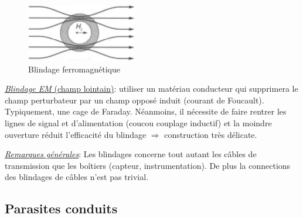 \begin{figure}[H] 
	\centering 
	\includegraphics[height=4\baselineskip]{ch3/image8} 
	\caption{Blindage ferromagnétique}
	\label{fig:blindmagn}
\end{figure}

\underline{\textit{Blindage EM} (champ lointain)}: utiliser un matériau conducteur qui supprimera le champ perturbateur par un champ opposé induit (courant de Foucault). Typiquement, une cage de Faraday. Néanmoins, il nécessite de faire rentrer les lignes de signal et d'alimentation (coucou couplage inductif) et la moindre ouverture réduit l'efficacité du blindage \(\Rightarrow\) construction très délicate.\bigbreak

\underline{\textit{Remarques générales}}: Les blindages concerne tout autant les câbles de transmission que les boîtiers (capteur, instrumentation). De plus la connections des blindages de câbles n'est pas trivial.
\subsection{Parasites conduits}

